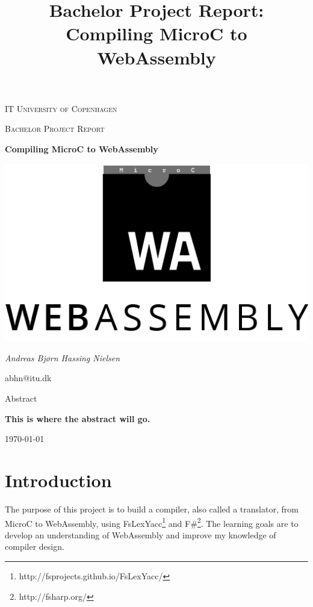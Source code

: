 \documentclass[a4paper]{article}
\title{Bachelor Project Report: Compiling MicroC to WebAssembly}
\begin{document}
\begin{titlepage}
	\centering
	{\scshape\LARGE IT University of Copenhagen \par}
	\vspace{1cm}
	{\scshape\Large Bachelor Project Report\par}
	\vspace{1.5cm}
	{\huge\bfseries Compiling MicroC to WebAssembly \par}
	\vspace{2cm}
	{\includegraphics{WebAssemblyLogo} \par}
	\vspace{2cm}
	{\Large\itshape Andreas Bjørn Hassing Nielsen\par}
	abhn@itu.dk\\
	\vspace{2cm}
	{\Large Abstract\par}
	{\bfseries This is where the abstract will go.}
	\vfill
	{\large \today\par}
\end{titlepage}

\newpage

\tableofcontents
\newpage


\section{Introduction}
The purpose of this project is to build a compiler, also called a translator, from MicroC to WebAssembly, using FsLexYacc\footnote{\label{footnote:fslexyacc-url}http://fsprojects.github.io/FsLexYacc/} and F\#\footnote{http://fsharp.org/}. The learning goals are to develop an understanding of WebAssembly and improve my knowledge of compiler design.
\end{document}
